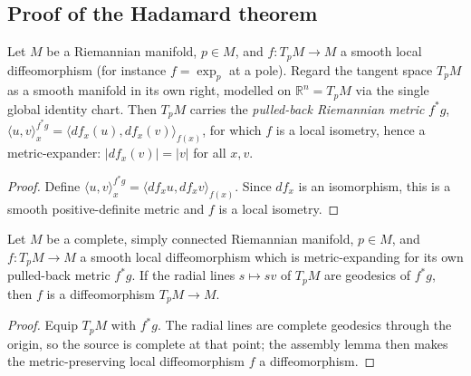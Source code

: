 \subsection{Proof of the Hadamard theorem}

\begin{lemma}

  \label{lem:dc-ch7-3-4-pullback-metric}
  \leanok
Let $M$ be a Riemannian manifold, $p\in M$, and $f:T_pM\to M$ a smooth local
  diffeomorphism (for instance $f=\exp_p$ at a pole). Regard the tangent space $T_pM$ as
  a smooth manifold in its own right, modelled on $\mathbb R^n=T_pM$ via the single global
  identity chart. Then $T_pM$ carries the \emph{pulled-back Riemannian metric} $f^*g$,
  $\langle u,v\rangle^{f^*g}_x=\langle df_x(u),df_x(v)\rangle_{f(x)}$, for which $f$ is a
  local isometry, hence a metric-expander: $|df_x(v)|=|v|$ for all $x,v$.
\begin{proof}

  \leanok
\sketch Define $\langle u,v\rangle^{f^*g}_x=\langle df_xu,df_xv\rangle_{f(x)}$. Since $df_x$ is an isomorphism, this is a smooth positive-definite metric and $f$ is a local isometry.
\end{proof}
\end{lemma}

\begin{lemma}

  \label{lem:dc-ch7-3-4-pole-diffeo}
  \leanok
Let $M$ be a complete, simply connected Riemannian manifold, $p\in M$, and $f:T_pM\to M$
  a smooth local diffeomorphism which is metric-expanding for its own pulled-back metric
  $f^*g$. If the radial lines $s\mapsto sv$ of $T_pM$ are geodesics of $f^*g$, then $f$ is a
  diffeomorphism $T_pM\to M$.
\begin{proof}

  \leanok
\sketch Equip $T_pM$ with $f^*g$. The radial lines are complete geodesics through the origin, so the source is complete at that point; the assembly lemma then makes the metric-preserving local diffeomorphism $f$ a diffeomorphism.
\end{proof}
\end{lemma}

